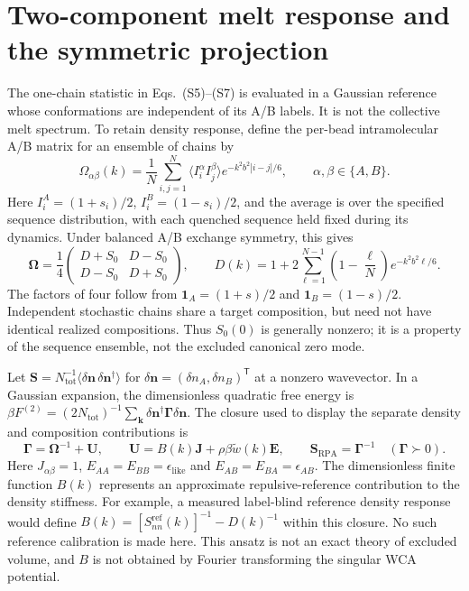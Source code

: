 \documentclass[pdflatex,sn-nature,onecolumn]{sn-jnl}
\begin{document}
\clearpage
\section*{Two-component melt response and the symmetric projection}

The one-chain statistic in Eqs.~(S5)--(S7) is evaluated in a Gaussian reference whose conformations are independent of its A/B labels. It is not the collective melt spectrum. To retain density response, define the per-bead intramolecular A/B matrix for an ensemble of chains by
\[
\Omega_{\alpha\beta}(k)=\frac1N\sum_{i,j=1}^N
 \bigl\langle I_i^\alpha I_j^\beta\bigr\rangle
 e^{-k^2b^2|i-j|/6},\qquad \alpha,\beta\in\{A,B\}.
\]
Here $I_i^A=(1+s_i)/2$, $I_i^B=(1-s_i)/2$, and the average is over the specified sequence distribution, with each quenched sequence held fixed during its dynamics. Under balanced A/B exchange symmetry, this gives
\[
\boldsymbol\Omega=\frac14
 \begin{pmatrix}D+S_0&D-S_0\\D-S_0&D+S_0\end{pmatrix},
\qquad
D(k)=1+2\sum_{\ell=1}^{N-1}\left(1-\frac\ell N\right)e^{-k^2b^2\ell/6}.
\]
The factors of four follow from $\mathbf 1_A=(1+s)/2$ and $\mathbf 1_B=(1-s)/2$. Independent stochastic chains share a target composition, but need not have identical realized compositions. Thus $S_0(0)$ is generally nonzero; it is a property of the sequence ensemble, not the excluded canonical zero mode.

Let $\mathbf S=N_{\mathrm{tot}}^{-1}\langle\delta\mathbf n\,\delta\mathbf n^{\dagger}\rangle$ for $\delta\mathbf n=(\delta n_A,\delta n_B)^{\mathsf T}$ at a nonzero wavevector. In a Gaussian expansion, the dimensionless quadratic free energy is $\beta F^{(2)}=(2N_{\mathrm{tot}})^{-1}\sum_{\bm k}\delta\mathbf n^{\dagger}\boldsymbol\Gamma\delta\mathbf n$. The closure used to display the separate density and composition contributions is
\[
\boldsymbol\Gamma=\boldsymbol\Omega^{-1}+\mathbf U,
\qquad
\mathbf U=B(k)\mathbf J+\rho\beta\widetilde w(k)\mathbf E,
\qquad
\mathbf S_{\mathrm{RPA}}=\boldsymbol\Gamma^{-1}
\quad(\boldsymbol\Gamma\succ0).
\]
Here $J_{\alpha\beta}=1$, $E_{AA}=E_{BB}=\epsilon_{\mathrm{like}}$ and $E_{AB}=E_{BA}=\epsilon_{AB}$. The dimensionless finite function $B(k)$ represents an approximate repulsive-reference contribution to the density stiffness. For example, a measured label-blind reference density response would define $B(k)=[S_{nn}^{\mathrm{ref}}(k)]^{-1}-D(k)^{-1}$ within this closure. No such reference calibration is made here. This ansatz is not an exact theory of excluded volume, and $B$ is not obtained by Fourier transforming the singular WCA potential.
\end{document}
